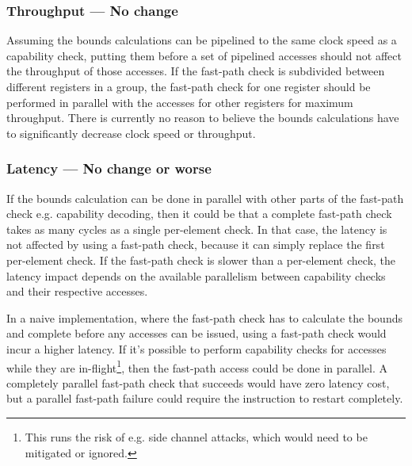 \subsubsection*{Throughput --- No change}
Assuming the bounds calculations can be pipelined to the same clock speed as a capability check, putting them before a set of pipelined accesses should not affect the throughput of those accesses.
If the fast-path check is subdivided between different registers in a group, the fast-path check for one register should be performed in parallel with the accesses for other registers for maximum throughput.
There is currently no reason to believe the bounds calculations have to significantly decrease clock speed or throughput.

\subsubsection*{Latency --- No change or worse}
If the bounds calculation can be done in parallel with other parts of the fast-path check e.g. capability decoding, then it could be that a complete fast-path check takes as many cycles as a single per-element check.
In that case, the latency is not affected by using a fast-path check, because it can simply replace the first per-element check.
If the fast-path check is slower than a per-element check, the latency impact depends on the available parallelism between capability checks and their respective accesses.

In a naive implementation, where the fast-path check has to calculate the bounds and complete before any accesses can be issued, using a fast-path check would incur a higher latency.
If it's possible to perform capability checks for accesses while they are in-flight\footnote{This runs the risk of e.g. side channel attacks, which would need to be mitigated or ignored.}, then the fast-path access could be done in parallel.
A completely parallel fast-path check that succeeds would have zero latency cost, but a parallel fast-path failure could require the instruction to restart completely.


